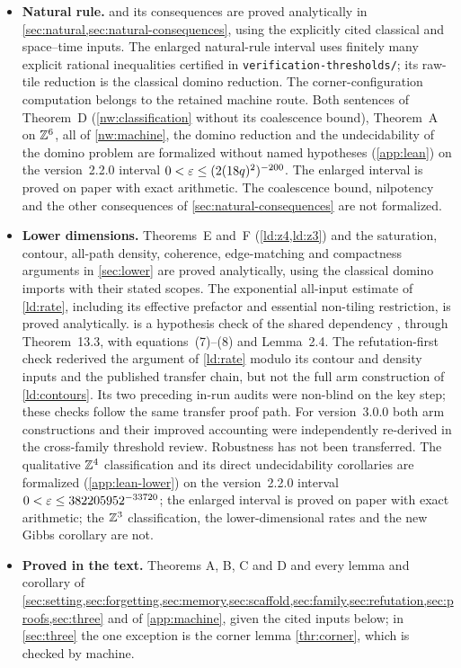 \begin{itemize}
\item \textbf{Natural rule.}  and its consequences are proved analytically in \cref{sec:natural,sec:natural-consequences}, using the explicitly cited classical and space--time inputs. The enlarged natural-rule interval uses finitely many explicit rational inequalities certified in \texttt{verification-\allowbreak thresholds/}; its raw-tile reduction is the classical domino reduction. The corner-configuration computation belongs to the retained machine route. Both sentences of Theorem~D (\cref{nw:classification} without its coalescence bound), Theorem~A on $\mathbb{Z}^6$, all of \cref{nw:machine}, the domino reduction and the undecidability of the domino problem are formalized without named hypotheses (\cref{app:lean}) on the version~2.2.0 interval $0<\varepsilon\le(2(18q)^2)^{-200}$. The enlarged interval is proved on paper with exact arithmetic. The coalescence bound, nilpotency and the other consequences of \cref{sec:natural-consequences} are not formalized.
\item \textbf{Lower dimensions.} Theorems~E and~F (\cref{ld:z4,ld:z3}) and the saturation, contour, all-path density, coherence, edge-matching and compactness arguments in \cref{sec:lower} are proved analytically, using the classical domino imports with their stated scopes. The exponential all-input estimate of \cref{ld:rate}, including its effective prefactor and essential non-tiling restriction, is proved analytically.  is a hypothesis check of the shared dependency \cite[Corollary~13.7]{DM26}, through Theorem~13.3, with equations~(7)--(8) and Lemma~2.4. The refutation-first check rederived the argument of \cref{ld:rate} modulo its contour and density inputs and the published transfer chain, but not the full arm construction of \cref{ld:contours}. Its two preceding in-run audits were non-blind on the key step; these checks follow the same transfer proof path. For version~3.0.0 both arm constructions and their improved accounting were independently re-derived in the cross-family threshold review. Robustness has not been transferred. The qualitative $\mathbb{Z}^4$ classification and its direct undecidability corollaries are formalized (\cref{app:lean-lower}) on the version~2.2.0 interval $0<\varepsilon\le382205952^{-33720}$; the enlarged interval is proved on paper with exact arithmetic; the $\mathbb{Z}^3$ classification, the lower-dimensional rates and the new Gibbs corollary are not.
\item \textbf{Proved in the text.} Theorems A, B, C and D and every lemma and corollary of \cref{sec:setting,sec:forgetting,sec:memory,sec:scaffold,sec:family,sec:refutation,sec:proofs,sec:three} and of \cref{app:machine}, given the cited inputs below; in \cref{sec:three} the one exception is the corner lemma \cref{thr:corner}, which is checked by machine.

\end{itemize}

